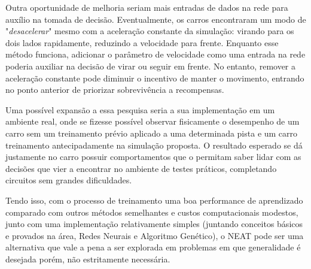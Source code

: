 Outra oportunidade de melhoria seriam mais entradas de dados na 
rede para aux{\'i}lio na tomada de decis{\~a}o. Eventualmente, os 
carros encontraram um modo de "\textit{desacelerar}"  mesmo com a 
acelera{\c c}{\~a}o constante da simula{\c c}{\~a}o: virando para 
os dois lados rapidamente, reduzindo a velocidade para frente. 
Enquanto esse m{\'e}todo funciona, adicionar o par{\^a}metro 
de velocidade como uma entrada na rede poderia auxiliar na decis{\~a}o 
de virar ou seguir em frente. No entanto, remover a acelera{\c c}{\~a}o 
constante pode diminuir o incentivo de manter o movimento, 
entrando no ponto anterior de priorizar sobreviv{\^e}ncia a recompensas.

Uma possível expansão a essa pesquisa seria a sua implementação em um ambiente real, 
onde se fizesse possível observar fisicamente o desempenho de um carro sem um treinamento prévio aplicado a uma determinada 
pista e um carro treinamento antecipadamente na simulação proposta. O resultado esperado se dá justamente no carro possuir 
comportamentos que o permitam saber lidar com as decisões que vier a encontrar no ambiente de testes práticos, completando circuitos 
sem grandes dificuldades.

Tendo isso, com o processo de treinamento uma boa
performance de aprendizado comparado com outros
m{\'e}todos semelhantes e custos computacionais 
modestos, junto com uma implementa{\c c}{\~a}o 
relativamente simples (juntando conceitos
básicos e provados na {\'a}rea, Redes Neurais e
Algoritmo Gen{\'e}tico), o NEAT pode ser uma
alternativa que vale a pena a ser explorada em
problemas em que generalidade {\'e} desejada
por{\'e}m, n{\~a}o estritamente necess{\'a}ria.
